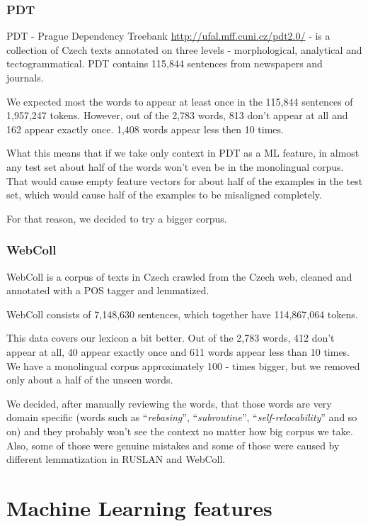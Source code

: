 \documentclass[letterpaper]{article}
\begin{document}
\subsubsection{PDT}
PDT - Prague Dependency Treebank \url{http://ufal.mff.cuni.cz/pdt2.0/} - is a collection of Czech texts annotated on three
levels - morphological, analytical and tectogrammatical.   
PDT contains 115,844 sentences from newspapers and journals.

We expected most the words to appear at least once in the 115,844 sentences of 1,957,247 tokens. 
However, out of the 2,783 words, 813 don't appear at all and 162 appear exactly once. 
1,408 words appear less then 10 times.

What this means that if we take only context in PDT as a ML feature, in almost 
any test set about half of the words won't even be in the monolingual corpus. 
That would cause empty feature vectors for about half of the examples in the test 
set, which would cause half of the examples to be misaligned completely.

For that reason, we decided to try a bigger corpus.

\subsubsection{WebColl}

WebColl\cite{webcoll} is a corpus of texts in Czech crawled from the Czech web, cleaned and annotated  with a POS tagger and lemmatized.

WebColl consists of 7,148,630 sentences, which together have 114,867,064 tokens. 

This data covers our lexicon a bit better. Out of the 2,783 words, 412 don't appear at all, 
40 appear exactly once and 611 words appear less than 10 times. We have a monolingual 
corpus approximately 100 - times bigger, but we removed only about a half of the unseen words.

We decided, after manually reviewing the words, that those words are very domain specific 
(words such as ``\emph{rebasing}'', ``\emph{subroutine}'', ``\emph{self-relocability}'' and so on) 
and they probably won't see the context no matter how big corpus we take. 
Also, some of those were genuine mistakes and some of those were caused by different lemmatization in RUSLAN and WebColl.


\section{Machine Learning features}
\end{document}
